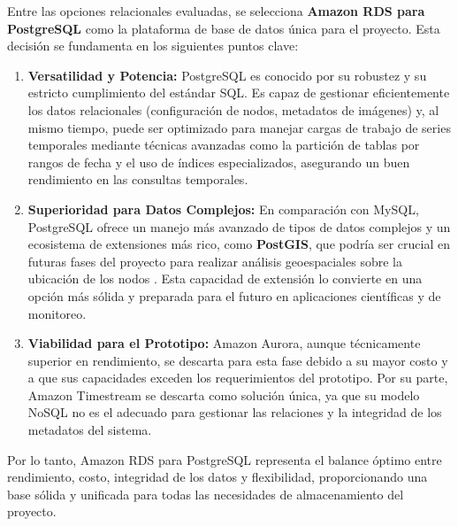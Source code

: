 Entre las opciones relacionales evaluadas, se selecciona \textbf{Amazon RDS para PostgreSQL} como la plataforma de base de datos única para el proyecto. Esta decisión se fundamenta en los siguientes puntos clave:

\begin{enumerate}
    \item \textbf{Versatilidad y Potencia:} PostgreSQL es conocido por su robustez y su estricto cumplimiento del estándar SQL. Es capaz de gestionar eficientemente los datos relacionales (configuración de nodos, metadatos de imágenes) y, al mismo tiempo, puede ser optimizado para manejar cargas de trabajo de series temporales mediante técnicas avanzadas como la partición de tablas por rangos de fecha y el uso de índices especializados, asegurando un buen rendimiento en las consultas temporales.
    
    \item \textbf{Superioridad para Datos Complejos:} En comparación con MySQL, PostgreSQL ofrece un manejo más avanzado de tipos de datos complejos y un ecosistema de extensiones más rico, como \textbf{PostGIS}, que podría ser crucial en futuras fases del proyecto para realizar análisis geoespaciales sobre la ubicación de los nodos \cite{postgresql2024about}. Esta capacidad de extensión lo convierte en una opción más sólida y preparada para el futuro en aplicaciones científicas y de monitoreo.

    \item \textbf{Viabilidad para el Prototipo:} Amazon Aurora, aunque técnicamente superior en rendimiento, se descarta para esta fase debido a su mayor costo y a que sus capacidades exceden los requerimientos del prototipo. Por su parte, Amazon Timestream se descarta como solución única, ya que su modelo NoSQL no es el adecuado para gestionar las relaciones y la integridad de los metadatos del sistema.
\end{enumerate}

Por lo tanto, Amazon RDS para PostgreSQL representa el balance óptimo entre rendimiento, costo, integridad de los datos y flexibilidad, proporcionando una base sólida y unificada para todas las necesidades de almacenamiento del proyecto.



